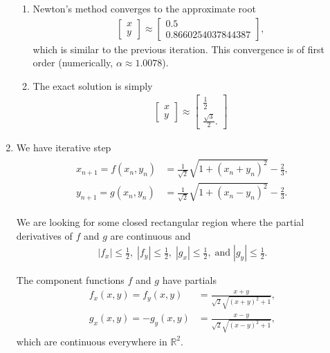 \documentclass[10pt]{article}
\begin{document}
\begin{enumerate}
\begin{enumerate}
      \item Newton's method converges to the approximate root \begin{align*}
        \begin{bmatrix}
          x \\
          y
        \end{bmatrix} \approx \begin{bmatrix}
          0.5 \\
          0.8660254037844387
        \end{bmatrix},
      \end{align*} which is similar to the previous iteration. This convergence is of first order (numerically, \(\alpha \approx 1.0078\)).

      \item The exact solution is simply \begin{align*}
        \begin{bmatrix}
          x \\
          y
        \end{bmatrix} \approx \begin{bmatrix}
          \frac{1}{2} \\
          \frac{\sqrt{3}}{2}.
        \end{bmatrix}
      \end{align*}

      {\small }
    \end{enumerate}

    \newpage
    \item We have iterative step \begin{align}\label{eq:iter}
        \begin{split}
        x_{n+1} = f(x_n, y_n) &= \frac{1}{\sqrt{2}}\sqrt{1+(x_n+y_n)^2} - \frac{2}{3}, \\
        y_{n+1} = g(x_n, y_n) &= \frac{1}{\sqrt{2}}\sqrt{1+(x_n-y_n)^2} - \frac{2}{3}.
        \end{split}
    \end{align}
    
    We are looking for some closed rectangular region where the partial derivatives of \(f\) and \(g\) are continuous and \begin{align}\label{eq:bound}
        |f_x| \leq \frac{1}{2},\;|f_y| \leq \frac{1}{2},\;|g_x| \leq \frac{1}{2},\;\mathrm{and}\;|g_y| \leq \frac{1}{2}.
    \end{align}

    The component functions \(f\) and \(g\) have partials \begin{align*}
        f_x(x,y) = f_y(x,y) &= \frac{x+y}{\sqrt{2}\sqrt{(x+y)^2+1}}, \\
        g_x(x, y) = -g_y(x,y) &= \frac{x-y}{\sqrt{2}\sqrt{(x-y)^2+1}},
    \end{align*} which are continuous everywhere in \(\mathbb{R}^2\).


\end{enumerate}
\end{document}
